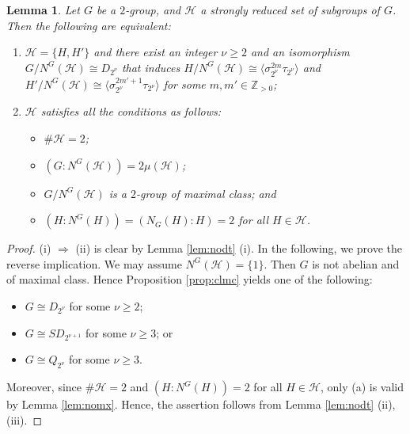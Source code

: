 \documentclass[12pt]{amsart}
\theoremstyle{plain}
\newtheorem{lem}[thm]{Lemma}
\theoremstyle{definition}
\numberwithin{thm}{section}
\numberwithin{equation}{section}
\newcommand{\Zpn}{\mathbb{Z}_{>0}}
\newcommand{\Z}{\mathbb{Z}}
\newcommand{\cH}{\mathcal{H}}
\begin{document}
\begin{lem}\label{lem:qphc}
Let $G$ be a $2$-group, and $\cH$ a strongly reduced set of subgroups of $G$. Then the following are equivalent: 
\begin{enumerate}
\item $\cH=\{H,H'\}$ and there exist an integer $\nu \geq 2$ and an isomorphism $G/N^{G}(\cH) \cong D_{2^{\nu}}$ that induces $H/N^{G}(\cH)\cong \langle \sigma_{2^{\nu}}^{2m}\tau_{2^{\nu}} \rangle$ and $H'/{N^{G}(\cH)}\cong \langle \sigma_{2^{\nu}}^{2m'+1}\tau_{2^{\nu}} \rangle$ for some $m,m'\in \Zpn$;
\item $\cH$ satisfies all the conditions as follows: 
\begin{itemize}
\item $\#\cH=2$;
\item $(G:N^{G}(\cH))=2\mu(\cH)$; 
\item $G/N^{G}(\cH)$ is a $2$-group of maximal class; and
\item $(H:N^{G}(H))=(N_{G}(H):H)=2$ for all $H\in \cH$. 
\end{itemize}
\end{enumerate}
\end{lem}

\begin{proof}
(i) $\Rightarrow$ (ii) is clear by Lemma \ref{lem:nodt} (i). In the following, we prove the reverse implication. We may assume $N^{G}(\cH)=\{1\}$. Then $G$ is not abelian and of maximal class. Hence Proposition \ref{prop:clmc} yields one of the following: 
\begin{itemize}
\item[(a)] $G\cong D_{2^{\nu}}$ for some $\nu \geq 2$; 
\item[(b)] $G\cong SD_{2^{\nu+1}}$ for some $\nu \geq 3$; or
\item[(c)] $G\cong Q_{2^{\nu}}$ for some $\nu\geq 3$. 
\end{itemize}
Moreover, since $\#\cH=2$ and $(H:N^{G}(H))=2$ for all $H\in \cH$, only (a) is valid by Lemma \ref{lem:nomx}. Hence, the assertion follows from Lemma \ref{lem:nodt} (ii), (iii). 
\end{proof}
\end{document}
